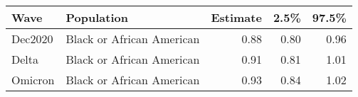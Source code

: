 \begin{table}[ht]
\centering
\begin{tabular}{llrrr}
  \hline
Wave & Population & Estimate & 2.5\% & 97.5\% \\ 
  \hline
Dec2020 & Black or African American & 0.88 & 0.80 & 0.96 \\ 
  Delta & Black or African American & 0.91 & 0.81 & 1.01 \\ 
  Omicron & Black or African American & 0.93 & 0.84 & 1.02 \\ 
   \hline
\end{tabular}
\end{table}
